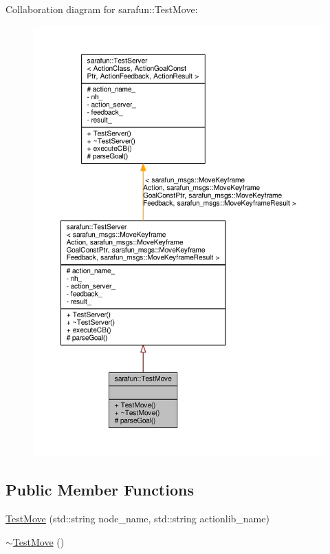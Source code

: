 Collaboration diagram for sarafun\-:\-:Test\-Move\-:\nopagebreak
\begin{figure}[H]
\begin{center}
\leavevmode
\includegraphics[width=350pt]{dc/def/classsarafun_1_1TestMove__coll__graph}
\end{center}
\end{figure}
\subsection*{Public Member Functions}
\begin{DoxyCompactItemize}
\item 
\hyperlink{classsarafun_1_1TestMove_ae9653a964d20cf520a9a9f51c73df36b_ae9653a964d20cf520a9a9f51c73df36b}{Test\-Move} (std\-::string node\-\_\-name, std\-::string actionlib\-\_\-name)
\item 
\hyperlink{classsarafun_1_1TestMove_a5e1d99c97f17c188913a0d8d6d1de927_a5e1d99c97f17c188913a0d8d6d1de927}{$\sim$\-Test\-Move} ()
\end{DoxyCompactItemize}
